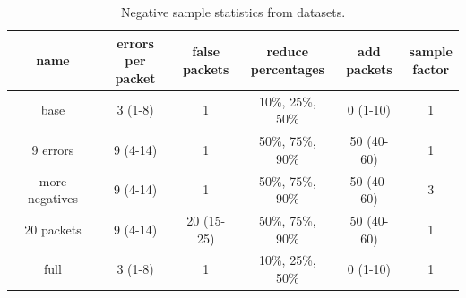 \documentclass[
	ngerman,
	ruledheaders=section,%
	class=report,%
	thesis={type=bachelor},%
	accentcolor=9c,%
	custommargins=true,%
	marginpar=false,%
	parskip=half-,%
	fontsize=11pt,%
	twoside
]{tudapub}
\begin{document}





\begin{table}
    \centering
    \begin{tabular}{|c|c|c|c|c|c|}
        \hline
        \textbf{name} & \shortstack{\textbf{errors} per\\ packet} & \shortstack{false\\ \textbf{packets}} & \shortstack{\textbf{reduce}\\ percentages} & \shortstack{\textbf{add}\\ packets} & \shortstack{sample\\ \textbf{factor}} \\
        \hline
        base & 3 (1-8) & 1 & 10\%, 25\%, 50\% & 0 (1-10) & 1 \\
        \hline
        9 errors & 9 (4-14) & 1 & 50\%, 75\%, 90\% & 50 (40-60) & 1 \\
        \hline
        more negatives & 9 (4-14) & 1 & 50\%, 75\%, 90\% & 50 (40-60) & 3 \\
        \hline
        20 packets & 9 (4-14) & 20 (15-25) & 50\%, 75\%, 90\% & 50 (40-60) & 1 \\
        \hline
        full & 3 (1-8) & 1 & 10\%, 25\%, 50\% & 0 (1-10) & 1 \\
        \hline
    \end{tabular}
    \caption{Negative sample statistics from datasets.}
    \label{tab:negativeSamples}
\end{table}
\end{document}
